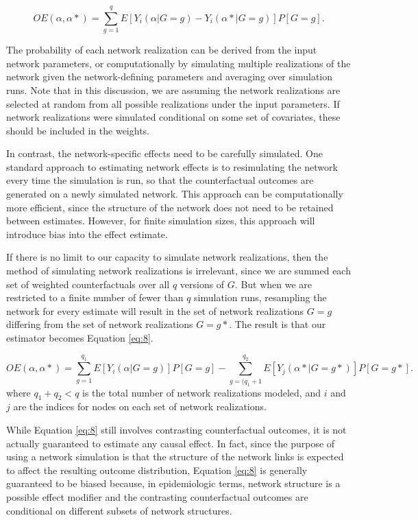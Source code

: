\documentclass{article}
\theoremstyle{definition}
\begin{document}
\begin{equation}\label{eq:7}
   OE\left(\alpha,\alpha* \right) = \sum_{g=1}^qE\left[Y_{i}\left(\alpha|G=g\right) - Y_{i}\left(\alpha*|G=g\right)\right]P\left[G=g\right].	
\end{equation}

The probability of each network realization can be derived from the input network parameters, or computationally by simulating multiple realizations of the network given the network-defining parameters and averaging over simulation runs. Note that in this discussion, we are assuming the network realizations are selected at random from all possible realizations under the input parameters. If network realizations were simulated conditional on some set of covariates, these should be included in the weights.

In contrast, the network-specific effects need to be carefully simulated. One standard approach to estimating network effects is to resimulating the network every time the simulation is run, so that the counterfactual outcomes are generated on a newly simulated network.  This approach can be computationally more efficient, since the structure of the network does not need to be retained between estimates. However, for finite simulation sizes, this approach will introduce bias into the effect estimate. 

If there is no limit to our capacity to simulate network realizations, then the method of simulating network realizations is irrelevant, since we are summed each set of weighted counterfactuals over all $q$ versions of $G$. But when we are restricted to a finite number of fewer than $q$ simulation runs, resampling the network for every estimate will result in the set of network realizations $G=g$ differing from the set of network realizations $G=g*$. The result is that our estimator becomes Equation \ref{eq:8}.

\begin{equation}\label{eq:8}
   OE\left(\alpha,\alpha* \right) = \sum_{g=1}^{q_1}E\left[Y_{i}\left(\alpha|G=g\right)\right]P\left[G=g\right]- \sum_{g=(q_1 +1}^{q_2}E\left[Y_{j}\left(\alpha*|G=g*\right)\right]P\left[G=g*\right].	
\end{equation}
where $q_1+q_2 < q$ is the total number of network realizations modeled, and $i$ and $j$ are the indices for nodes on each set of network realizations.

While Equation \ref{eq:8} still involves contrasting counterfactual outcomes, it is not actually guaranteed to estimate any causal effect. In fact, since the purpose of using a network simulation is that the structure of the network links is expected to affect the resulting outcome distribution, Equation \ref{eq:8} is generally guaranteed to be biased because, in epidemiologic terms, network structure is a possible effect modifier \cite{buchanan_spillover_2022} and the contrasting counterfactual outcomes are conditional on different subsets of network structures.
\end{document}
